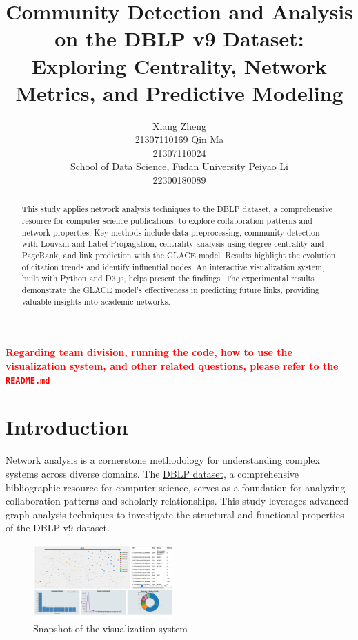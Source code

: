 \documentclass[11pt]{article}
\title{Community Detection and Analysis on the DBLP v9 Dataset: Exploring Centrality, Network Metrics, and Predictive Modeling}
\author{
    Xiang Zheng \\ 21307110169 \And  
    Qin Ma      \\ 21307110024 
    \vspace{0.2cm} \\ %
    \hfill School of Data Science, Fudan University \hfill
    \And
    Peiyao Li \\ 22300180089
}
\begin{document}
\maketitle
\begin{abstract}
	This study applies network analysis techniques to the DBLP dataset, a comprehensive resource for computer science publications, to explore collaboration patterns and network properties. Key methods include data preprocessing, community detection with Louvain and Label Propagation, centrality analysis using degree centrality and PageRank, and link prediction with the GLACE model. Results highlight the evolution of citation trends and identify influential nodes. An interactive visualization system, built with Python and D3.js, helps present the findings. The experimental results demonstrate the GLACE model's effectiveness in predicting future links, providing valuable insights into academic networks.
\end{abstract}

\textbf{\textcolor{red}{Regarding team division, running the code, how to use the visualization system, and other related questions, please refer to the \texttt{README.md}}}

\section{Introduction}

Network analysis is a cornerstone methodology for understanding complex systems across diverse domains. The \href{https://www.aminer.cn/citation}{DBLP dataset}, a comprehensive bibliographic resource for computer science, serves as a foundation for analyzing collaboration patterns and scholarly relationships. This study leverages advanced graph analysis techniques to investigate the structural and functional properties of the DBLP v9 dataset.

\begin{figure}[ht]
	\centering
	\includegraphics[width=0.48\textwidth]{img/introduction/visualization.png}
	\caption{Snapshot of the visualization system}
	\label{fig:visualize}
\end{figure}
\end{document}
